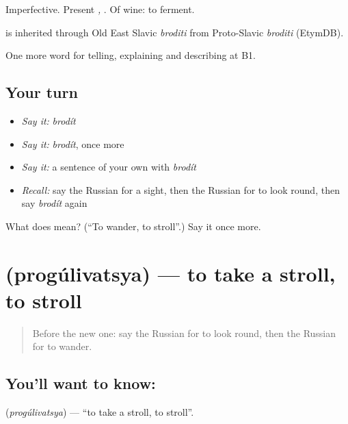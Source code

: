 Imperfective. Present \emph{, }. Of wine: to ferment.

\begin{cousinweb}
\emph{} is inherited through Old East Slavic \emph{broditi} from Proto-Slavic \emph{broditi} (EtymDB).
\end{cousinweb}

\begin{grammarlens}[title={What you've built}]
One more word for telling, explaining and describing at B1.
\end{grammarlens}

\subsection*{Your turn}
\begin{itemize}
\raggedright
  \item \emph{Say it:} \emph{brodít}
  \item \emph{Say it:} \emph{brodít}, once more
  \item \emph{Say it:} a sentence of your own with \emph{brodít}
  \item \emph{Recall:} say the Russian for a sight, then the Russian for to look round, then say \emph{brodít} again
\end{itemize}

\begin{tcolorbox}[breakable,colback=teal!4,colframe=teal!35!black,title={Before you move on}]
What does  mean? (\textquotedblleft{}To wander, to stroll\textquotedblright{}.) Say it once more.
\end{tcolorbox}
\section[\texorpdfstring{\ru{прогуливаться} (progúlivatsya)}{прогуливаться (progúlivatsya)}]{ (progúlivatsya) — to take a stroll, to stroll}

\label{lesson:RU-C443-progulivatsya}



\begin{quote}
Before the new one: say the Russian for to look round, then the Russian for to wander.
\end{quote}

\subsection*{You'll want to know: }
\textbf{} (\emph{progúlivatsya}) — \textquotedblleft{}to take a stroll, to stroll\textquotedblright{}.

